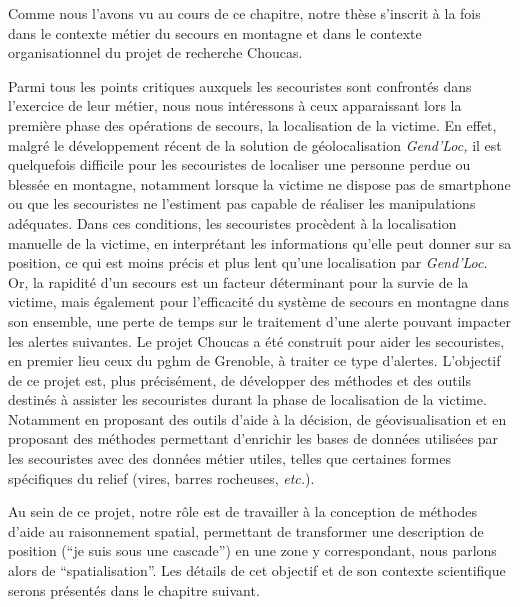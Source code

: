 Comme nous l'avons vu au cours de ce chapitre, notre thèse s'inscrit à
la fois dans le contexte métier du secours en montagne et dans
le contexte organisationnel du projet de recherche Choucas.

Parmi tous les points critiques auxquels les secouristes sont
confrontés dans l'exercice de leur métier, nous nous intéressons à
ceux apparaissant lors la première phase des opérations de secours, la
localisation de la victime. En effet, malgré le développement récent
de la solution de géolocalisation \emph{Gend'Loc,} il est quelquefois
difficile pour les secouristes de localiser une personne perdue ou
blessée en montagne, notamment lorsque la victime ne dispose pas de
smartphone ou que les secouristes ne l'estiment pas capable de
réaliser les manipulations adéquates. Dans ces conditions, les
secouristes procèdent à la localisation manuelle de la victime, en
interprétant les informations qu'elle peut donner sur sa position, ce
qui est moins précis et plus lent qu'une localisation par
\emph{Gend'Loc.} Or, la rapidité d'un secours est un facteur
déterminant pour la survie de la victime, mais également pour
l'efficacité du système de secours en montagne dans son ensemble, une
perte de temps sur le traitement d'une alerte pouvant impacter les
alertes suivantes. Le projet Choucas a été construit pour aider les
secouristes, en premier lieu ceux du \ac{pghm} de Grenoble, à traiter
ce type d'alertes. L'objectif de ce projet est, plus précisément, de
développer des méthodes et des outils destinés à assister les
secouristes durant la phase de localisation de la victime. Notamment
en proposant des outils d'aide à la décision, de géovisualisation et
en proposant des méthodes permettant d'enrichir les bases de données
utilisées par les secouristes avec des données métier utiles, telles
que certaines formes spécifiques du relief (\eg vires, barres
rocheuses, \emph{etc.}).

Au sein de ce projet, notre rôle est de travailler à la conception de
méthodes d'aide au raisonnement spatial, permettant de transformer une
description de position (\eg \enquote{je suis sous une cascade}) en
une zone y correspondant, nous parlons alors de
\enquote{spatialisation}. Les détails de cet objectif et de son
contexte scientifique serons présentés dans le chapitre suivant.

